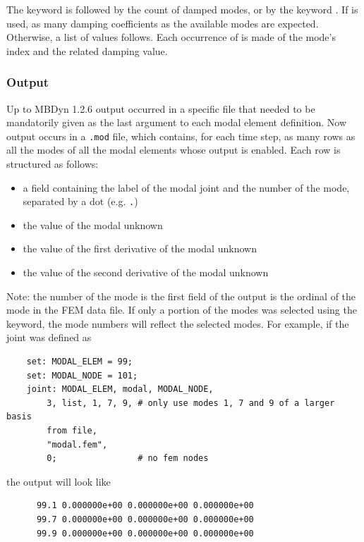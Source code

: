 The keyword  is followed by the count of damped modes,
or by the keyword .
If  is used, as many damping coefficients as the available modes
are expected.
Otherwise, a list of  values follows.
Each occurrence of  is made of the mode's index
and the related damping value.


\subsubsection{Output}
Up to MBDyn 1.2.6 output occurred in a specific file that needed
to be mandatorily given as the last argument to each modal element
definition.
Now output occurs in a \texttt{.mod} file, which contains, for each time step,
as many rows as all the modes of all the modal elements whose output is enabled.
Each row is structured as follows:
\begin{itemize}
\item a field containing the label of the modal joint and the number of the mode,
separated by a dot (e.g. \texttt{.})
\item the value of the modal unknown
\item the value of the first derivative of the modal unknown
\item the value of the second derivative of the modal unknown
\end{itemize}
Note: the number of the mode is the first field of the output
is the ordinal of the mode in the FEM data file.
If only a portion of the modes was selected using the  keyword,
the mode numbers will reflect the selected modes.
For example, if the  joint was defined as
\begin{verbatim}
    set: MODAL_ELEM = 99;
    set: MODAL_NODE = 101;
    joint: MODAL_ELEM, modal, MODAL_NODE,
        3, list, 1, 7, 9, # only use modes 1, 7 and 9 of a larger basis
        from file,
        "modal.fem",
        0;                # no fem nodes
\end{verbatim}
the output will look like
\begin{verbatim}
      99.1 0.000000e+00 0.000000e+00 0.000000e+00
      99.7 0.000000e+00 0.000000e+00 0.000000e+00
      99.9 0.000000e+00 0.000000e+00 0.000000e+00
\end{verbatim}

